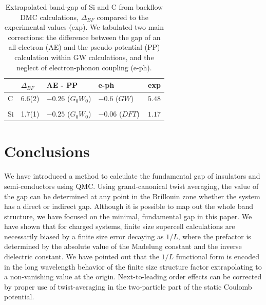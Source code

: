 \begin{table}
\caption{Extrapolated band-gap
of Si and C from backflow DMC calculations, $\Delta_{BF}$
compared to the experimental values (exp).
We tabulated two main corrections:
the difference  between the gap of an all-electron (AE) and the pseudo-potential (PP)
calculation within GW calculations, and
the neglect of electron-phonon coupling (e-ph).
\label{tab:c-si-gap-corr}}
\begin{tabular}{lllll}
\hline\hline
& $\Delta_{BF}$ & AE - PP & e-ph  & exp \\
\hline
C & 6.6(2) &   $-0.26$ ($G_0W_0$) \cite{GomezAbal08} & $-0.6$ ($GW$)~~\cite{Giustino10} & $5.48$ \cite{exp}\\
\hline \\
Si &  1.7(1)  & $-0.25$ ($G_0W_0$)\cite{GomezAbal08}  & $-0.06$ ($DFT$) \cite{Monserrat14} & $1.17$ \cite{exp} \\
\hline\hline
\end{tabular}
\end{table}


\section{Conclusions}
\label{sec:conclude}

We have introduced a method to calculate the fundamental gap of insulators and semi-conductors
using QMC. Using grand-canonical twist averaging, 
the value of the gap can be determined at any point in the Brillouin zone whether the system has a direct or indirect gap. Although it is 
possible to map out the whole band structure, we have focused on the minimal, fundamental gap
in this paper. We have shown that for charged systems, finite size supercell calculations
are necessarily biased by a finite size error decaying as $1/L$, where the prefactor
is determined by the absolute value of the Madelung constant and the inverse dielectric constant.
We have pointed out that the $1/L$ functional form is encoded in the long wavelength behavior of
the finite size structure factor extrapolating to a non-vanishing value at the origin.
Next-to-leading order effects can be corrected by proper use of twist-averaging in the
two-particle part of the static Coulomb potential. 

